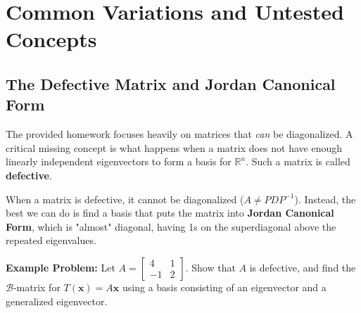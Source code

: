 \documentclass[11pt, a4paper]{article}
\theoremstyle{definition}
\theoremstyle{remark}
\newcommand{\R}{\mathbb{R}}
\begin{document}
\newpage
\section{Common Variations and Untested Concepts}

\subsection{The Defective Matrix and Jordan Canonical Form}
The provided homework focuses heavily on matrices that \textit{can} be diagonalized. A critical missing concept is what happens when a matrix does not have enough linearly independent eigenvectors to form a basis for $\R^n$. Such a matrix is called \textbf{defective}.

When a matrix is defective, it cannot be diagonalized ($A \neq PDP^{-1}$). Instead, the best we can do is find a basis that puts the matrix into \textbf{Jordan Canonical Form}, which is "almost" diagonal, having 1s on the superdiagonal above the repeated eigenvalues.

\textbf{Example Problem:} Let $A = \begin{bmatrix} 4 & 1 \\ -1 & 2 \end{bmatrix}$. Show that $A$ is defective, and find the $\mathcal{B}$-matrix for $T(\mathbf{x}) = A\mathbf{x}$ using a basis consisting of an eigenvector and a generalized eigenvector.
\end{document}
